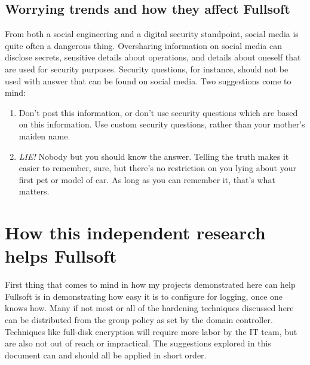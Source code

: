 \hypertarget{worrying-trends-and-how-they-affect-fullsoft}{%
\subsection{Worrying trends and how they affect
Fullsoft}\label{worrying-trends-and-how-they-affect-fullsoft}}

From both a social engineering and a digital security standpoint, social
media is quite often a dangerous thing. Oversharing information on
social media can disclose secrets, sensitive details about operations,
and details about oneself that are used for security purposes. Security
questions, for instance, should not be used with answer that can be
found on social media. Two suggestions come to mind:

\begin{enumerate}
\def\labelenumi{\arabic{enumi}.}
\item
  Don't post this information, or don't use security questions which are
  based on this information. Use custom security questions, rather than
  your mother's maiden name.
\item
  \emph{LIE!} Nobody but you should know the answer. Telling the truth
  makes it easier to remember, sure, but there's no restriction on you
  lying about your first pet or model of car. As long as you can
  remember it, that's what matters.
\end{enumerate}

\hypertarget{how-this-independent-research-helps-fullsoft}{%
\section{How this independent research helps
Fullsoft}\label{how-this-independent-research-helps-fullsoft}}

First thing that comes to mind in how my projects demonstrated here can
help Fullsoft is in demonstrating how easy it is to configure for
logging, once one knows how. Many if not most or all of the hardening
techniques discussed here can be distributed from the group policy as
set by the domain controller. Techniques like full-disk encryption will
require more labor by the IT team, but are also not out of reach or
impractical. The suggestions explored in this document can and should
all be applied in short order.
